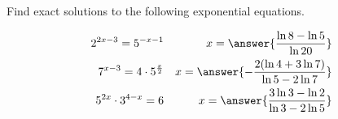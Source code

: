 \documentclass{ximera}
\author{Nela Lakos \and Kyle Parsons}
\begin{document}
\begin{exercise}

Find exact solutions to the following exponential equations.

\begin{align*}
2^{2x-3}=5^{-x-1} && x=\answer{\frac{\ln{8} - \ln{5}}{\ln{20}}}\\
7^{x-3}=4\cdot5^{\frac{x}{2}} && x=\answer{-\frac{2(\ln{4} + 3\ln{7})}{\ln{5} - 2\ln{7}}}\\
5^{2x}\cdot3^{4-x}=6 && x=\answer{\frac{3\ln{3} - \ln{2}}{\ln{3} - 2\ln{5}}}
\end{align*}

\end{exercise}
\end{document}

